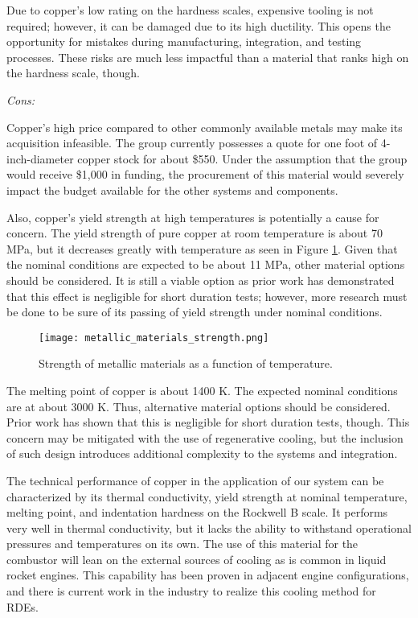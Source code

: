 Due to copper’s low rating on the hardness scales, expensive tooling is not required; however, it can be damaged due to its high ductility. This opens the opportunity for mistakes during manufacturing, integration, and testing processes. These risks are much less impactful than a material that ranks high on the hardness scale, though.

\noindent\textit{Cons:}

Copper’s high price compared to other commonly available metals may make its acquisition infeasible. The group currently possesses a quote for one foot of 4-inch-diameter copper stock for about \$550. Under the assumption that the group would receive \$1,000 in funding, the procurement of this material would severely impact the budget available for the other systems and components.

Also, copper’s yield strength at high temperatures is potentially a cause for concern. The yield strength of pure copper at room temperature is about 70 MPa, but it decreases greatly with temperature as seen in Figure \ref{fig:metallic-materials-strength}. Given that the nominal conditions are expected to be about 11 MPa, other material options should be considered. It is still a viable option as prior work has demonstrated that this effect is negligible for short duration tests; however, more research must be done to be sure of its passing of yield strength under nominal conditions.

\begin{figure}
    \centering
    \texttt{[image: metallic\_materials\_strength.png]}
    \caption{Strength of metallic materials as a function of temperature.}
    \label{fig:metallic-materials-strength}
\end{figure}

The melting point of copper is about 1400 K. The expected nominal conditions are at about 3000 K. Thus, alternative material options should be considered. Prior work has shown that this is negligible for short duration tests, though. This concern may be mitigated with the use of regenerative cooling, but the inclusion of such design introduces additional complexity to the systems and integration.

The technical performance of copper in the application of our system can be characterized by its thermal conductivity, yield strength at nominal temperature, melting point, and indentation hardness on the Rockwell B scale. It performs very well in thermal conductivity, but it lacks the ability to withstand operational pressures and temperatures on its own. The use of this material for the combustor will lean on the external sources of cooling as is common in liquid rocket engines. This capability has been proven in adjacent engine configurations, and there is current work in the industry to realize this cooling method for RDEs.

